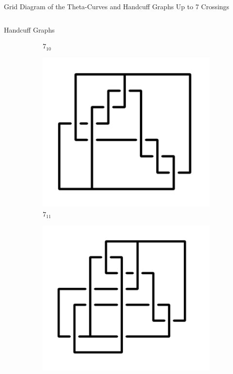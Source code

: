 \documentclass[final]{beamer}
\begin{document}
\begin{frame}[t]
\begin{alertblock}{Grid Diagram of the Theta-Curves and Handcuff Graphs Up to 7 Crossings}
\begin{columns}[t]
\begin{column}{0.5\textwidth}
\begin{alertblock}{Handcuff Graphs}
\begin{figure}
\begin{subfigure}{0.075\textwidth}
    \caption{$7_{10}$} 
    \end{subfigure}
    \begin{subfigure}{0.075\textwidth}
    \includegraphics[width=\columnwidth]{../Midterm_Poster/grid_diagram/handcuff_7_11.png}
    \caption{$7_{11}$} 
    \end{subfigure}
    \begin{subfigure}{0.075\textwidth}
    \includegraphics[width=\columnwidth]{../Midterm_Poster/grid_diagram/handcuff_7_12.png}

\end{subfigure}
\end{figure}
\end{alertblock}
\end{column}
\end{columns}
\end{alertblock}
\end{frame}
\end{document}
